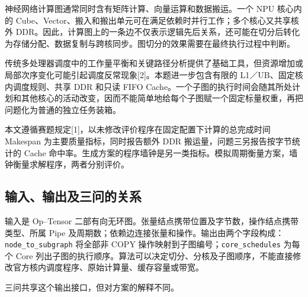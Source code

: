\documentclass[anonymous,notoc]{gmcm2026}
\begin{document}
神经网络计算图通常同时含有矩阵计算、向量运算和数据搬运。一个 NPU 核心内的 Cube、Vector、搬入和搬出单元可在满足依赖时并行工作；多个核心又共享核外 DDR。因此，计算图上的一条边不仅表示逻辑先后关系，还可能在切分后转化为存储分配、数据复制与跨核同步。图切分的效果需要在最终执行过程中判断。

传统多处理器调度中的工作量平衡和关键路径分析提供了基础工具，但资源增加或局部次序变化可能引起调度反常现象{[}2{]}。本题进一步包含有限的 L1／UB、固定核内调度规则、共享 DDR 和只读 FIFO Cache。一个子图的执行时间会随其所处计划和其他核心的活动改变，因而不能简单地给每个子图赋一个固定标量权重，再把问题化为普通的独立任务装箱。

本文遵循赛题规定{[}1{]}，以未修改评价程序在固定配置下计算的总完成时间 Makespan 为主要质量指标，同时报告额外 DDR 搬运量，问题三另报告按字节统计的 Cache 命中率。生成方案的程序墙钟是另一类指标。模拟周期衡量方案，墙钟衡量求解程序，两者分别评价。

\subsection{输入、输出及三问的关系}\label{ux8f93ux5165ux8f93ux51faux53caux4e09ux95eeux7684ux5173ux7cfb}

输入是 Op--Tensor 二部有向无环图。张量结点携带位置及字节数，操作结点携带类型、所属 Pipe 及周期数；依赖边连接张量和操作。输出由两个字段构成：\texttt{node\_to\_subgraph} 将全部非 COPY 操作映射到子图编号；\texttt{core\_schedules} 为每个 Core 列出子图的执行顺序。算法可以决定切分、分核及子图顺序，不能直接修改官方核内调度程序、原始计算量、缓存容量或带宽。

三问共享这个输出接口，但对方案的解释不同。
\end{document}
